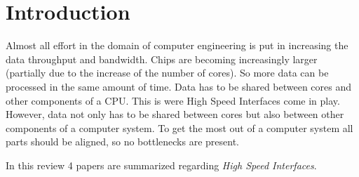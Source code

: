 \section{Introduction} \label{sec:introduction} 

Almost all effort in the domain of computer engineering is put in increasing the data throughput and bandwidth. 
Chips are becoming increasingly larger (partially due to the increase of the number of cores).
So more data can be processed in the same amount of time.
Data has to be shared between cores and other components of a CPU.
This is were High Speed Interfaces come in play. 
However, data not only has to be shared between cores but also between other components of a computer system.
To get the most out of a computer system all parts should be aligned, so no bottlenecks are present.


In this review 4 papers are summarized regarding \textit{High Speed Interfaces}. 






